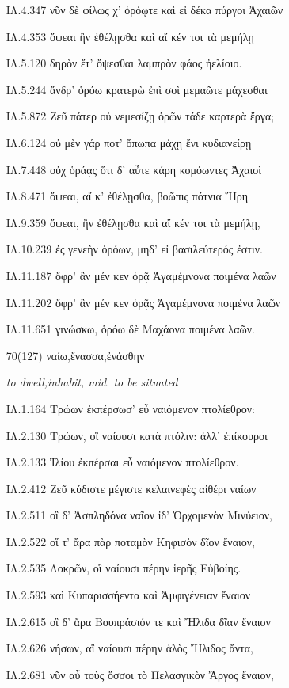 \begin{enumerate}
{ΙΛ.4.347 νῦν δὲ φίλως χ' ὁρόῳτε καὶ εἰ δέκα πύργοι Ἀχαιῶν 

ΙΛ.4.353 ὄψεαι ἢν ἐθέλῃσθα καὶ αἴ κέν τοι τὰ μεμήλῃ 

ΙΛ.5.120 δηρὸν ἔτ' ὄψεσθαι λαμπρὸν φάος ἠελίοιο. 

ΙΛ.5.244 ἄνδρ' ὁρόω κρατερὼ ἐπὶ σοὶ μεμαῶτε μάχεσθαι 

ΙΛ.5.872 Ζεῦ πάτερ οὐ νεμεσίζῃ ὁρῶν τάδε καρτερὰ ἔργα; 

ΙΛ.6.124 οὐ μὲν γάρ ποτ' ὄπωπα μάχῃ ἔνι κυδιανείρῃ 

ΙΛ.7.448 οὐχ ὁράᾳς ὅτι δ' αὖτε κάρη κομόωντες Ἀχαιοὶ 

ΙΛ.8.471 ὄψεαι, αἴ κ' ἐθέλῃσθα, βοῶπις πότνια Ἥρη 

ΙΛ.9.359 ὄψεαι, ἢν ἐθέλῃσθα καὶ αἴ κέν τοι τὰ μεμήλῃ, 

ΙΛ.10.239 ἐς γενεὴν ὁρόων, μηδ' εἰ βασιλεύτερός ἐστιν. 

ΙΛ.11.187 ὄφρ' ἂν μέν κεν ὁρᾷ Ἀγαμέμνονα ποιμένα λαῶν 

ΙΛ.11.202 ὄφρ' ἂν μέν κεν ὁρᾷς Ἀγαμέμνονα ποιμένα λαῶν 

ΙΛ.11.651 γινώσκω, ὁρόω δὲ Μαχάονα ποιμένα λαῶν. 

}

\clearpage
\item[\large 70(127)]{\large \g ναίω,ἔνασσα,ἐνάσθην}

\hspace{0.2cm} \textit{  to dwell,inhabit, mid. to be situated}

{\g
ΙΛ.1.164 Τρώων ἐκπέρσωσ' εὖ ναιόμενον πτολίεθρον: 

ΙΛ.2.130 Τρώων, οἳ ναίουσι κατὰ πτόλιν: ἀλλ' ἐπίκουροι 

ΙΛ.2.133 Ἰλίου ἐκπέρσαι εὖ ναιόμενον πτολίεθρον. 

ΙΛ.2.412 Ζεῦ κύδιστε μέγιστε κελαινεφὲς αἰθέρι ναίων 

ΙΛ.2.511 οἳ δ' Ἀσπληδόνα ναῖον ἰδ' Ὀρχομενὸν Μινύειον, 

ΙΛ.2.522 οἵ τ' ἄρα πὰρ ποταμὸν Κηφισὸν δῖον ἔναιον, 

ΙΛ.2.535 Λοκρῶν, οἳ ναίουσι πέρην ἱερῆς Εὐβοίης. 

ΙΛ.2.593 καὶ Κυπαρισσήεντα καὶ Ἀμφιγένειαν ἔναιον 

ΙΛ.2.615 οἳ δ' ἄρα Βουπράσιόν τε καὶ Ἤλιδα δῖαν ἔναιον 

ΙΛ.2.626 νήσων, αἳ ναίουσι πέρην ἁλὸς Ἤλιδος ἄντα, 

ΙΛ.2.681 νῦν αὖ τοὺς ὅσσοι τὸ Πελασγικὸν Ἄργος ἔναιον, 

}
\end{enumerate}
